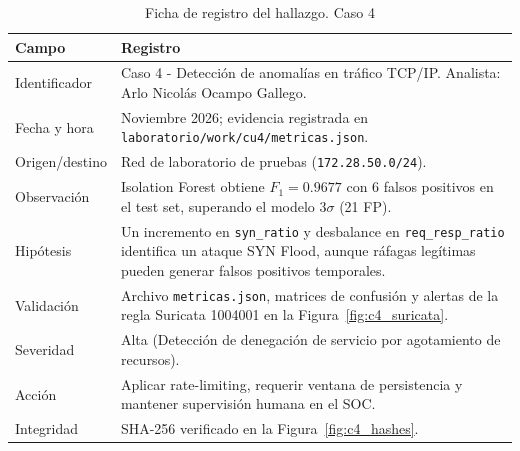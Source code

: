 \begin{table}[H]
\centering
\caption{Ficha de registro del hallazgo. Caso 4}
\label{tab:ficha-c4}
\footnotesize
\renewcommand{\arraystretch}{1.2}
\begin{tabularx}{\textwidth}{@{}>{\raggedright\arraybackslash}p{} Y@{}}
\toprule
\textbf{Campo} & \textbf{Registro} \\
\midrule
Identificador & Caso 4 - Detección de anomalías en tráfico TCP/IP. Analista: Arlo Nicolás Ocampo Gallego. \\\hline
Fecha y hora & Noviembre 2026; evidencia registrada en \texttt{laboratorio/work/cu4/metricas.json}. \\\hline
Origen/destino & Red de laboratorio de pruebas (\texttt{172.28.50.0/24}). \\\hline
Observación & Isolation Forest obtiene $F_1=0.9677$ con 6 falsos positivos en el test set, superando el modelo $3\sigma$ (21 FP). \\\hline
Hipótesis & Un incremento en \texttt{syn\_ratio} y desbalance en \texttt{req\_resp\_ratio} identifica un ataque SYN Flood, aunque ráfagas legítimas pueden generar falsos positivos temporales. \\\hline
Validación & Archivo \texttt{metricas.json}, matrices de confusión y alertas de la regla Suricata 1004001 en la Figura~\ref{fig:c4_suricata}. \\\hline
Severidad & Alta (Detección de denegación de servicio por agotamiento de recursos). \\\hline
Acción & Aplicar rate-limiting, requerir ventana de persistencia y mantener supervisión humana en el SOC. \\\hline
Integridad & SHA-256 verificado en la Figura~\ref{fig:c4_hashes}. \\
\bottomrule
\end{tabularx}
\end{table}